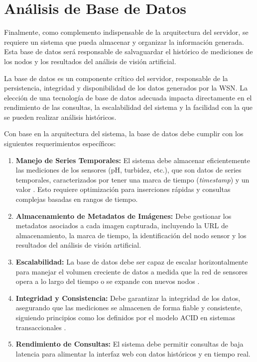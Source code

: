 \section{Análisis de Base de Datos}
\label{sec:analisis_db}
Finalmente, como complemento indispensable de la arquitectura del servidor, se requiere un sistema que pueda almacenar y organizar la información generada. Esta base de datos será responsable de salvaguardar el histórico de mediciones de los nodos y los resultados del análisis de visión artificial.



La base de datos es un componente crítico del servidor, responsable de la persistencia, integridad y disponibilidad de los datos generados por la WSN. La elección de una tecnología de base de datos adecuada impacta directamente en el rendimiento de las consultas, la escalabilidad del sistema y la facilidad con la que se pueden realizar análisis históricos.

Con base en la arquitectura del sistema, la base de datos debe cumplir con los siguientes requerimientos específicos:

\begin{enumerate}
    \item \textbf{Manejo de Series Temporales:} El sistema debe almacenar eficientemente las mediciones de los sensores (pH, turbidez, etc.), que son datos de series temporales, caracterizados por tener una marca de tiempo (\textit{timestamp}) y un valor \cite{influxdata2024timeseries}. Esto requiere optimización para inserciones rápidas y consultas complejas basadas en rangos de tiempo.
    \item \textbf{Almacenamiento de Metadatos de Imágenes:} Debe gestionar los metadatos asociados a cada imagen capturada, incluyendo la URL de almacenamiento, la marca de tiempo, la identificación del nodo sensor y los resultados del análisis de visión artificial.
    \item \textbf{Escalabilidad:} La base de datos debe ser capaz de escalar horizontalmente para manejar el volumen creciente de datos a medida que la red de sensores opera a lo largo del tiempo o se expande con nuevos nodos \cite{mongodb2024scalability}.
    \item \textbf{Integridad y Consistencia:} Debe garantizar la integridad de los datos, asegurando que las mediciones se almacenen de forma fiable y consistente, siguiendo principios como los definidos por el modelo ACID en sistemas transaccionales \cite{oracle2024acid}.
    \item \textbf{Rendimiento de Consultas:} El sistema debe permitir consultas de baja latencia para alimentar la interfaz web con datos históricos y en tiempo real.
\end{enumerate}

